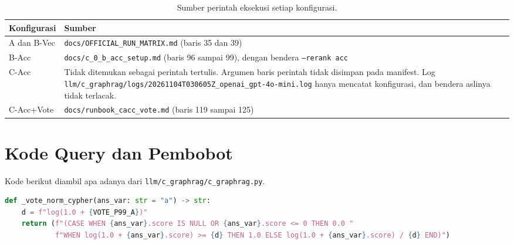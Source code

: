 \begin{table}[!htbp]
\centering
\small
\caption{Sumber perintah eksekusi setiap konfigurasi.}
\label{tab:lamp-perintah}
\renewcommand{\arraystretch}{1.2}
\begin{tabularx}{\textwidth}{|l|>{\raggedright\arraybackslash}X|}
\hline
\textbf{Konfigurasi} & \textbf{Sumber} \\
\hline
A dan B-Vec & \texttt{docs/\allowbreak{}OFFICIAL\_\allowbreak{}RUN\_\allowbreak{}MATRIX.\allowbreak{}md} (baris 35 dan 39) \\
\hline
B-Acc & \texttt{docs/\allowbreak{}c\_\allowbreak{}0\_\allowbreak{}b\_\allowbreak{}acc\_\allowbreak{}setup.\allowbreak{}md} (baris 96 sampai 99), dengan bendera \texttt{--rerank acc} \\
\hline
C-Acc & Tidak ditemukan sebagai perintah tertulis. Argumen baris perintah tidak disimpan pada manifest. Log \texttt{llm/\allowbreak{}c\_\allowbreak{}graphrag/\allowbreak{}logs/\allowbreak{}20261104T030605Z\_\allowbreak{}openai\_\allowbreak{}gpt-4o-mini.\allowbreak{}log} hanya mencatat konfigurasi, dan bendera aslinya tidak terlacak. \\
\hline
C-Acc+Vote & \texttt{docs/\allowbreak{}runbook\_\allowbreak{}cacc\_\allowbreak{}vote.\allowbreak{}md} (baris 119 sampai 125) \\
\hline
\end{tabularx}
\end{table}

\section{Kode Query dan Pembobot}
\label{sec:lamp-d-cypher}

Kode berikut diambil apa adanya dari \texttt{llm/\allowbreak{}c\_\allowbreak{}graphrag/\allowbreak{}c\_\allowbreak{}graphrag.\allowbreak{}py}.


\begin{lstlisting}[caption={Pembobot normalisasi suara (\texttt{\_vote\_norm\_cypher}, baris 230 sampai 233).}, label={lst:vote-norm}, frame=single, captionpos=t, language=Python, basicstyle=\ttfamily\scriptsize, breaklines=true, breakatwhitespace=false, columns=fullflexible, keepspaces=true]
def _vote_norm_cypher(ans_var: str = "a") -> str:
    d = f"log(1.0 + {VOTE_P99_A})"
    return (f"(CASE WHEN {ans_var}.score IS NULL OR {ans_var}.score <= 0 THEN 0.0 "
            f"WHEN log(1.0 + {ans_var}.score) >= {d} THEN 1.0 ELSE log(1.0 + {ans_var}.score) / {d} END)")
\end{lstlisting}

